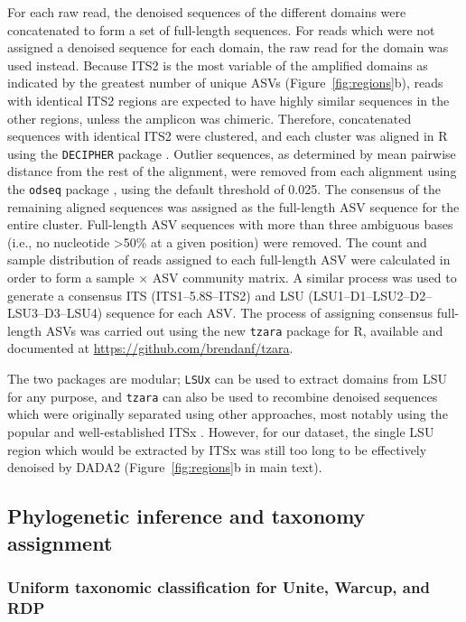 \documentclass[
]{article}
\begin{document}
For each raw read, the denoised sequences of the different domains were concatenated to form a set of full-length sequences.
For reads which were not assigned a denoised sequence for each domain, the raw read for the domain was used instead.
Because ITS2 is the most variable of the amplified domains as indicated by the greatest number of unique ASVs (Figure~\ref{fig:regions}b), reads with identical ITS2 regions are expected to have highly similar sequences in the other regions, unless the amplicon was chimeric.
Therefore, concatenated sequences with identical ITS2 were clustered, and each cluster was aligned in R using the \texttt{DECIPHER} package \autocite{wright2015}.
Outlier sequences, as determined by mean pairwise distance from the rest of the alignment, were removed from each alignment using the \texttt{odseq} package \autocite{jehl2015}, using the default threshold of 0.025.
The consensus of the remaining aligned sequences was assigned as the full-length ASV sequence for the entire cluster.
Full-length ASV sequences with more than three ambiguous bases (i.e., no nucleotide \textgreater50\% at a given position) were removed.
The count and sample distribution of reads assigned to each full-length ASV were calculated in order to form a sample × ASV community matrix.
A similar process was used to generate a consensus ITS (ITS1--5.8S--ITS2) and LSU (LSU1--D1--LSU2--D2--LSU3--D3--LSU4) sequence for each ASV.
The process of assigning consensus full-length ASVs was carried out using the new \texttt{tzara} package for R, available and documented at \url{https://github.com/brendanf/tzara}.

The two packages are modular; \texttt{LSUx} can be used to extract domains from LSU for any purpose, and \texttt{tzara} can also be used to recombine denoised sequences which were originally separated using other approaches, most notably using the popular and well-established ITSx \autocite{bengtsson-palme2013}.
However, for our dataset, the single LSU region which would be extracted by ITSx was still too long to be effectively denoised by DADA2 (Figure~\ref{fig:regions}b in main text).

\hypertarget{phylogeny-supplement}{%
\subsection{Phylogenetic inference and taxonomy assignment}\label{phylogeny-supplement}}

\hypertarget{uniform-taxonomic-classification-for-unite-warcup-and-rdp}{%
\subsubsection{Uniform taxonomic classification for Unite, Warcup, and RDP}\label{uniform-taxonomic-classification-for-unite-warcup-and-rdp}}
\end{document}
